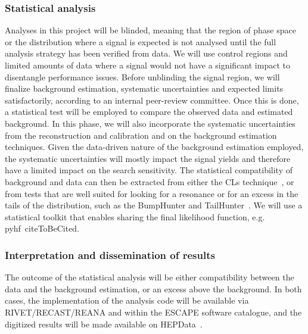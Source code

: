 \subsubsection{Statistical analysis} Analyses in this project will be blinded, meaning that the region of phase space or the distribution where a signal is expected is not analysed until the full analysis strategy has been verified from data. We will use control regions and limited amounts of data where a signal would not have a significant impact to disentangle performance issues. 
Before unblinding the signal region, we will finalize background estimation, systematic uncertainties and expected limits satisfactorily, according to an internal peer-review committee. 
Once this is done, a statistical test will be employed to compare the observed data and estimated background. In this phase, we will also incorporate the systematic uncertainties from the reconstruction and calibration and on the background estimation techniques. 
Given the data-driven nature of the background estimation employed, the systematic uncertainties will mostly impact the signal yields and therefore have a limited impact on the search sensitivity. 
The statistical compatibility of background and data can then be extracted from either the CLs technique~\cite{ToBeCited}, %
or from tests that are well suited for looking for a resonance or for an excess in the tails of the distribution, such as the BumpHunter and TailHunter~\cite{ToBeCited}. %
We will use a statistical toolkit that enables sharing the final likelihood function, e.g. pyhf~cite{ToBeCited}. %

\subsubsection{Interpretation and dissemination of results} The outcome of the statistical analysis will be either compatibility between the data and the background estimation, or an excess above the background. In both cases, the implementation of the analysis code will be available via RIVET/RECAST/REANA and within the ESCAPE software catalogue, and the digitized results will be made available on HEPData~\cite{ToBeCited}. %

